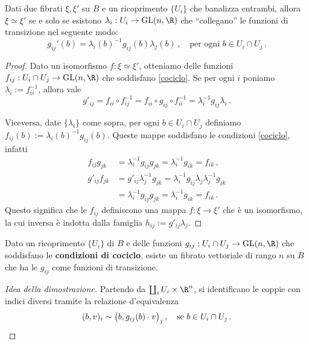 \begin{thm}\label{iso-fibrati-vettoriali}
	Dati due fibrati $\xi, \xi'$ su $B$ e un ricoprimento $\{U_{i}\}$ che banalizza entrambi,
	allora $\xi \simeq \xi'$ se e solo se esistono $\lambda_{i}:U_{i} \to \mathrm{GL}(n,\R)$
	che ``collegano'' le funzioni di transizione nel seguente modo:
	\begin{equation*}
		g_{ij}'(b) = \lambda_{i}(b) ^{-1} g_{ij}(b) \lambda_{j}(b)\,,
		\quad \text{per ogni } b \in U_{i} \cap U_{j}\,.
	\end{equation*}
	\begin{proof}
		Dato un isomorfismo $f:\xi \simeq \xi'$, 
		otteniamo delle funzioni $f_{ij}:U_{i} \cap U_{j} \to \mathrm{GL}(n,\R)$
		che soddisfano \eqref{cociclo}. 
		Se per ogni $i$ poniamo $\lambda_{i} := f_{ii}^{-1}$,
		allora vale
		\begin{equation*}
			g'_{ij} = f_{ii} \circ f_{ij}^{-1}
			= f_{ii} \circ g_{ij} \circ f_{ii}^{-1}
			= \lambda_{i}^{-1} g_{ij} \lambda_{i}\,.
		\end{equation*}
		
		Viceversa, date $\{\lambda_{i}\}$ come sopra, per ogni $b \in U_{i} \cap U_{j}$
		definiamo $f_{ij}(b) := \lambda_{i}(b)^{-1} g_{ij}(b)$.
		Queste mappe soddisfano le condizioni \eqref{cociclo}, infatti
		\begin{align*}
			f_{ij} g_{jk} &= \lambda_{i}^{-1} g_{ij} g_{jk} 
			= \lambda_{i}^{-1}g_{ik} =  f_{ik}\,, \\
			g'_{ij} f_{jk} &= g'_{ij} \lambda_{j}^{-1} g_{jk} 
			= \lambda_{i}^{-1} g_{ij} \lambda_{j} \lambda_{j}^{-1} g_{jk} \\
			&= \lambda_{i}^{-1} g_{ij} g_{jk} = \lambda_{i}^{-1} g_{ik} = f_{ik}\,.
		\end{align*}
		Questo significa che le $f_{ij}$ definiscono una mappa $f:\xi \to \xi'$
		che è un isomorfismo, la cui inversa è indotta dalla famiglia $h_{ij} := g'_{ij} \lambda_{j}$.
	\end{proof}
\end{thm}

\begin{thm}\label{teo-esisteza-fibrato}
	Dato un ricoprimento $\{U_{i}\}$ di $B$ e delle funzioni 
	$g_{ij}:U_{i} \cap U_{j} \to \mathrm{GL}(n,\R)$ che soddisfano le \textbf{condizioni di cociclo},
	esiste un fibrato vettoriale di rango $n$ su $B$ che ha le $g_{ij}$ come
	funzioni di transizione.
	\begin{proof}[Idea della dimostrazione]
		Partendo da $\coprod_{i} U_{i} \times \R^{n}$,
		si identificano le coppie con indici diversi 
		tramite la relazione d'equivalenza
		\begin{equation*}
			(b,v)_{i} \sim \big(b, g_{ij}(b) \cdot v \big)_{j}\,, \quad
			\text{se } b \in U_{i} \cap U_{j}\,. \qedhere
		\end{equation*}
	\end{proof}
\end{thm}

